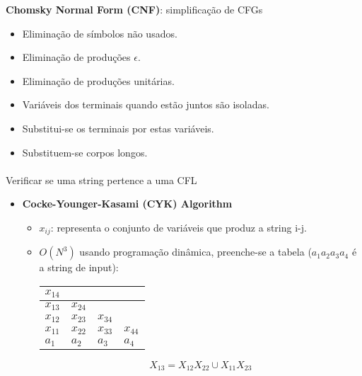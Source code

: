 \documentclass[../resumosTCOM.tex]{subfiles}
\begin{document}
 

\textbf{Chomsky Normal Form (CNF)}: simplificação de CFGs
\begin{itemize}
    \item Eliminação de símbolos não usados.
    \item Eliminação de produções $\epsilon$.
    \item Eliminação de produções unitárias.
    \item Variáveis dos terminais quando estão juntos são isoladas.
    \item Substitui-se os terminais por estas variáveis.
    \item Substituem-se corpos longos.
\end{itemize}

\paragraph{}

Verificar se uma string pertence a uma CFL
\begin{itemize}
    \item \textbf{Cocke-Younger-Kasami (CYK) Algorithm}
    \begin{itemize}
        \item $x_{ij}$: representa o conjunto de variáveis que produz a string i-j.
        \item $O(N^3)$ usando programação dinâmica, preenche-se a tabela ($a_1a_2a_3a_4$ é a string de input):
        
        \begin{table}[H]
            \centering
            \begin{tabular}{llll}
            \hline
            \multicolumn{1}{|l|}{$x_{14}$} & \multicolumn{1}{l|}{}         & \multicolumn{1}{l|}{}         & \multicolumn{1}{l|}{}         \\ \hline
            \multicolumn{1}{|l|}{$x_{13}$} & \multicolumn{1}{l|}{$x_{24}$} & \multicolumn{1}{l|}{}         & \multicolumn{1}{l|}{}         \\ \hline
            \multicolumn{1}{|l|}{$x_{12}$} & \multicolumn{1}{l|}{$x_{23}$} & \multicolumn{1}{l|}{$x_{34}$} & \multicolumn{1}{l|}{}         \\ \hline
            \multicolumn{1}{|l|}{$x_{11}$} & \multicolumn{1}{l|}{$x_{22}$} & \multicolumn{1}{l|}{$x_{33}$} & \multicolumn{1}{l|}{$x_{44}$} \\ \hline
            $a_1$                          & $a_2$                         & $a_3$                         & $a_4$                        
            \end{tabular}
        \end{table}
        \[X_{13} = X_{12}X_{22} \cup X_{11}X_{23}\]
    \end{itemize}
\end{itemize}
\end{document}
